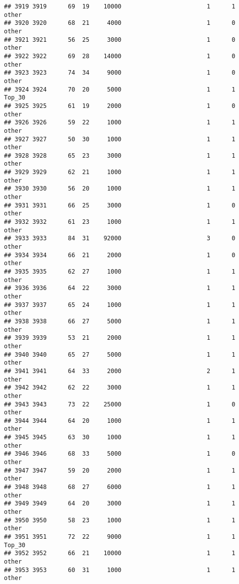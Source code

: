 \documentclass[
]{article}
\begin{document}
\begin{verbatim}
## 3919 3919      69  19    10000                        1      1    other
## 3920 3920      68  21     4000                        1      0    other
## 3921 3921      56  25     3000                        1      0    other
## 3922 3922      69  28    14000                        1      0    other
## 3923 3923      74  34     9000                        1      0    other
## 3924 3924      70  20     5000                        1      1   Top_30
## 3925 3925      61  19     2000                        1      0    other
## 3926 3926      59  22     1000                        1      1    other
## 3927 3927      50  30     1000                        1      1    other
## 3928 3928      65  23     3000                        1      1    other
## 3929 3929      62  21     1000                        1      1    other
## 3930 3930      56  20     1000                        1      1    other
## 3931 3931      66  25     3000                        1      0    other
## 3932 3932      61  23     1000                        1      1    other
## 3933 3933      84  31    92000                        3      0    other
## 3934 3934      66  21     2000                        1      0    other
## 3935 3935      62  27     1000                        1      1    other
## 3936 3936      64  22     3000                        1      1    other
## 3937 3937      65  24     1000                        1      1    other
## 3938 3938      66  27     5000                        1      1    other
## 3939 3939      53  21     2000                        1      1    other
## 3940 3940      65  27     5000                        1      1    other
## 3941 3941      64  33     2000                        2      1    other
## 3942 3942      62  22     3000                        1      1    other
## 3943 3943      73  22    25000                        1      0    other
## 3944 3944      64  20     1000                        1      1    other
## 3945 3945      63  30     1000                        1      1    other
## 3946 3946      68  33     5000                        1      0    other
## 3947 3947      59  20     2000                        1      1    other
## 3948 3948      68  27     6000                        1      1    other
## 3949 3949      64  20     3000                        1      1    other
## 3950 3950      58  23     1000                        1      1    other
## 3951 3951      72  22     9000                        1      1   Top_30
## 3952 3952      66  21    10000                        1      1    other
## 3953 3953      60  31     1000                        1      1    other

\end{verbatim}
\end{document}
